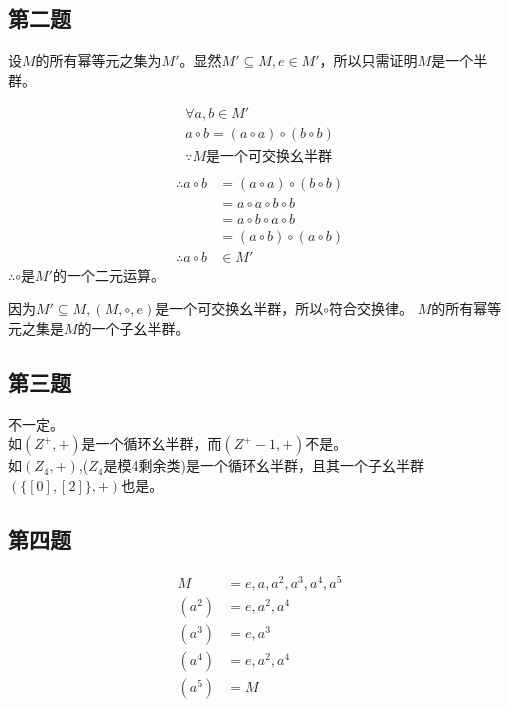 \documentclass[12pt,onecolumn]{article}
\theoremstyle{plain}
\begin{document}
\subsection{第二题}
\begin{proof*}
  设$M$的所有幂等元之集为$M'$。显然$M' \subseteq M, e\in M'$，所以只需证明$M$是一个半群。

  \begin{gather*}
    \forall a, b \in M' \\
    a \circ b = (a \circ a) \circ (b \circ b) \\
    \because M\text{是一个可交换幺半群} \\
  \end{gather*}
  \begin{align*}
    \therefore a \circ b &= (a \circ a) \circ (b \circ b) \\
            &= a \circ a \circ b \circ b \\
            &= a \circ b \circ a \circ b \\
            &= (a \circ b) \circ (a \circ b) \\
    \therefore a \circ b &\in M'
  \end{align*}
  \indent $\therefore \circ $是$ M'$的一个二元运算。

  因为$M' \subseteq M, (M, \circ, e)$是一个可交换幺半群，所以$\circ $符合交换律。
  $M$的所有幂等元之集是$M$的一个子幺半群。
\end{proof*}

\subsection{第三题}
不一定。 \\
如$(Z^+, +)$是一个循环幺半群，而$(Z^+ - {1}, +)$不是。\\
如$(Z_4, +)$,($Z_4$是模4剩余类)是一个循环幺半群，且其一个子幺半群$(\{[0], [2]\},+)$也是。

\subsection{第四题}
\begin{align*}
  M &= {e, a, a^2, a^3, a^4, a^5} \\
  (a^2) &= {e, a^2, a^4} \\
  (a^3) &= {e, a^3} \\
  (a^4) &= {e, a^2, a^4} \\
  (a^5) &= M
\end{align*}
\end{document}
